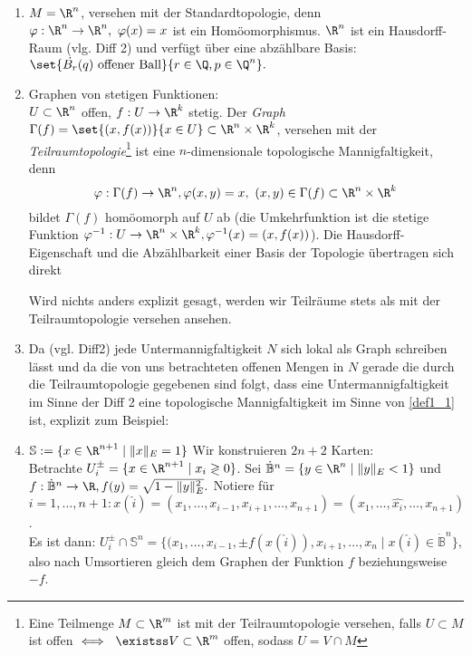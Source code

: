 \begin{exmp}
	\begin{enumerate}[label= {\roman*})]
		\item $M = \R^n$, versehen mit der Standardtopologie, denn $ \varphi: \R^n \to \R^n,\ \varphi(x) = x $ ist ein Homöomorphismus. $\R^n$ ist ein Hausdorff-Raum (vlg. Diff 2) und verfügt über eine abzählbare Basis: $ \set{\dot{B_r}(q) \ \text{offener Ball}}{r \in \Q, p \in \Q^n}. $
		\item Graphen von stetigen Funktionen:\\
			$ U \subset \R^n $ offen, $f: U \to \R^k$ stetig. Der \emph{Graph} $ \Gamma(f) = \set{(x,f(x))}{x \in U} \subset \R^n \times \R^k $, versehen mit der \emph{Teilraumtopologie}\footnote{
				Eine Teilmenge $M\subset \R^m$ ist mit der Teilraumtopologie versehen, falls $ U \subset M $ ist offen $ \iff \ \existss V \subset \R^m $ offen, sodass $ U = V \cap M $}
			ist eine $n$-dimensionale topologische Mannigfaltigkeit, denn $$ \varphi: \Gamma(f) \to \R^n, \varphi(x,y) = x,\ (x,y) \in \Gamma(f) \subset \R^n \times \R^k $$ bildet $\Gamma(f)$ homöomorph auf $U$ ab (die Umkehrfunktion ist die stetige Funktion $ \varphi^{-1}: U \to \R^n \times \R^k, \varphi^{-1}(x) = (x,f(x)) $). Die Hausdorff-Eigenschaft und die Abzählbarkeit einer Basis der Topologie übertragen sich direkt
			\begin{rem*}
				Wird nichts anders explizit gesagt, werden wir Teilräume stets als mit der Teilraumtopologie versehen ansehen.
			\end{rem*}
		\item Da (vgl. Diff2) jede Untermannigfaltigkeit $N$ sich lokal als Graph schreiben lässt und da die von uns betrachteten offenen Mengen in $N$ gerade die durch die Teilraumtopologie gegebenen sind folgt, dass eine Untermannigfaltigkeit im Sinne der Diff 2 eine topologische Mannigfaltigkeit im Sinne von \ref{def1_1} ist, explizit zum Beispiel:
		\item $\mathbb{S} := \{ x \in \R^{n+1} \mid \|x\|_E = 1 \} $
			Wir konstruieren $2n+2$ Karten:\\
			Betrachte $ U_i^\pm = \{ x \in \R^{n+1} \mid x_i \gtrless 0 \} $. Sei $ \dot{\mathbb{B}}^n = \{y \in \R^n \mid \|y\|_E < 1 \} $ und $ f: \dot{\mathbb{B}}^n \to \R, f(y) = \sqrt{1-\|y\|_E^2}. $ Notiere für $ i = 1,\dotsc,n+1: x(\hat{i}) = (x_1,\dots, x_{i-1},x_{i+1},\dotsc,x_{n+1}) = (x_1,\dotsc,\hat{x_i},\dotsc,x_{n+1}) $.\\
			Es ist dann: $ U_i^\pm \cap \mathbb{S}^n = \{ (x_1,\dotsc,x_{i-1}, \pm f(x(\hat{i})), x_{i+1},\dotsc,x_n \mid x(\hat{i}) \in \dot{\mathbb{B}}^n \}, $ also nach Umsortieren gleich dem Graphen der Funktion $f$ beziehungsweise $-f$.\\

\end{enumerate}
\end{exmp}
